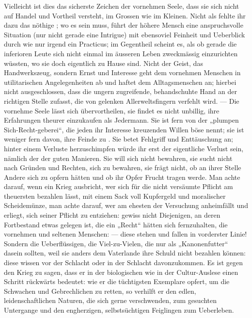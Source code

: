 Vielleicht ist dies das sicherste Zeichen der vornehmen Seele, dass sie sich nicht auf Handel und Vortheil versteht, im Grossen wie im Kleinen. Nicht als fehlte ihr dazu das nöthige ; wo es sein muss, führt der höhere Mensch eine anspruchsvolle Situation (nur nicht gerade eine Intrigue) mit ebensoviel Feinheit und Ueberblick durch wie nur irgend ein Practicus; im Gegentheil scheint es, als ob gerade die inferioren Leute sich nicht einmal im äusseren Leben zweckmässig einzurichten wüssten, wo sie doch eigentlich zu Hause sind. Nicht der Geist, das Handwerkszeug, sondern Ernst und Interesse geht dem vornehmen Menschen in utilitarischen Angelegenheiten ab und haftet dem Alltagsmenschen an; hierbei nicht ausgeschlossen, dass die ungern zugreifende, behandschuhte Hand an der richtigen Stelle zufasst, die von gelenken Allerweltsfingern verfehlt wird. — Die vornehme Seele lässt sich übervortheilen, sie findet es nicht unbillig, ihre Erfahrungen theurer einzukaufen als Jedermann. Sie ist fern von der „plumpen Sich-Recht-geberei“, die jeden ihr Interesse kreuzenden Willen böse nennt; sie ist weniger fern davon, ihre Feinde zu . Sie betet Fehlgriff und Enttäuschung an; hinter einem Verluste herzuschimpfen würde ihr erst der eigentliche Verlust sein, nämlich der der guten Manieren. Sie will sich nicht bewahren, sie sucht nicht nach Gründen und Rechten, sich zu bewahren, sie frägt nicht, ob an ihrer Stelle Andere sich zu opfern hätten und ob ihr Opfer Frucht tragen werde. Man achte darauf, wenn ein Krieg ausbricht, wer sich für die nicht versäumte Pflicht am theuersten bezahlen lässt, mit einem Sack voll Kupfergeld und moralischer Scheidemünze, man achte darauf, wer am ehesten der Versuchung anheimfällt und erliegt, sich seiner Pflicht zu entziehen: gewiss nicht Diejenigen, an deren Fortbestand etwas gelegen ist, die ein „Recht“ hätten sich fernzuhalten, die vornehmen und seltenen Menschen: — diese stehen und fallen in vorderster Linie! Sondern die Ueberflüssigen, die Viel-zu-Vielen, die nur als „Kanonenfutter“ dasein sollten, weil sie anders dem Vaterlande ihre Schuld nicht bezahlen können: diese wissen vor der Schlacht oder in der Schlacht davonzukommen. Es ist gegen den Krieg zu sagen, dass er in der biologischen wie in der Cultur-Auslese einen Schritt rückwärts bedeutet: wie er die tüchtigsten Exemplare opfert, um die Schwachen und Gebrechlichen zu retten, so verhilft er den edlen, leidenschaftlichen Naturen, die sich gerne verschwenden, zum gesuchten Untergange und den engherzigen, selbstsüchtigen Feiglingen zum Ueberleben.
\par

